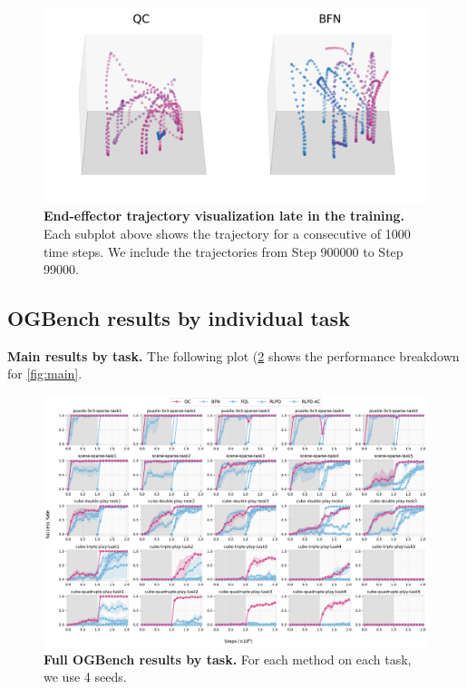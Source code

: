 \begin{figure}[H]
\includegraphics[width=0.32\linewidth]{figures/viz/traj_viz_comb_908_simplified.pdf}
\caption{\textbf{End-effector trajectory visualization late in the training.} Each subplot above shows the trajectory for a consecutive of 1000 time steps. We include the trajectories from Step 900000 to Step 99000.}
\label{fig:traj-viz-late}
\end{figure}

\subsection{OGBench results by individual task}

\textbf{Main results by task.} The following plot (\cref{fig:main-all-individual} shows the performance breakdown for \cref{fig:main}.
\begin{figure}[H]
    \centering
\includegraphics[width=\linewidth]{figures/main-all-individual-ablation.pdf}
    \caption{\textbf{Full OGBench results by task.} For each method on each task, we use 4 seeds.}
    \label{fig:main-all-individual}
\end{figure}


